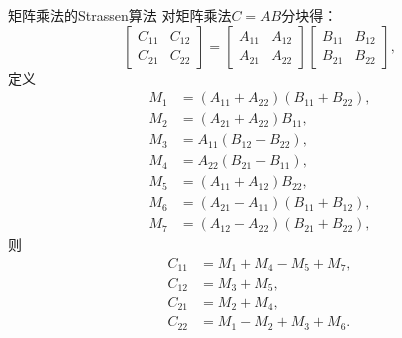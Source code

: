 \begin{theorem}
    {矩阵乘法的Strassen算法}{}
    对矩阵乘法$C=AB$分块得：
    \[
        \begin{bmatrix}
            C_{11}&C_{12}\\
            C_{21}&C_{22}
        \end{bmatrix}=\begin{bmatrix}
            A_{11}&A_{12}\\
            A_{21}&A_{22}
        \end{bmatrix}\begin{bmatrix}
            B_{11}&B_{12}\\
            B_{21}&B_{22}
        \end{bmatrix},
    \]
    定义 
    \begin{subequations}
        \begin{align}
            M_1&=(A_{11}+A_{22})(B_{11}+B_{22}),\\
            M_2&=(A_{21}+A_{22})B_{11},\\
            M_3&=A_{11}(B_{12}-B_{22}),\\
            M_4&=A_{22}(B_{21}-B_{11}),\\
            M_5&=(A_{11}+A_{12})B_{22},\\
            M_6&=(A_{21}-A_{11})(B_{11}+B_{12}),\\
            M_7&=(A_{12}-A_{22})(B_{21}+B_{22}),
        \end{align}
    \end{subequations}
    则
    \begin{subequations}
        \begin{align}
            C_{11}&=M_1+M_4-M_5+M_7,\\
            C_{12}&=M_3+M_5,\\
            C_{21}&=M_2+M_4,\\
            C_{22}&=M_1-M_2+M_3+M_6.
        \end{align}
    \end{subequations}
\end{theorem}

